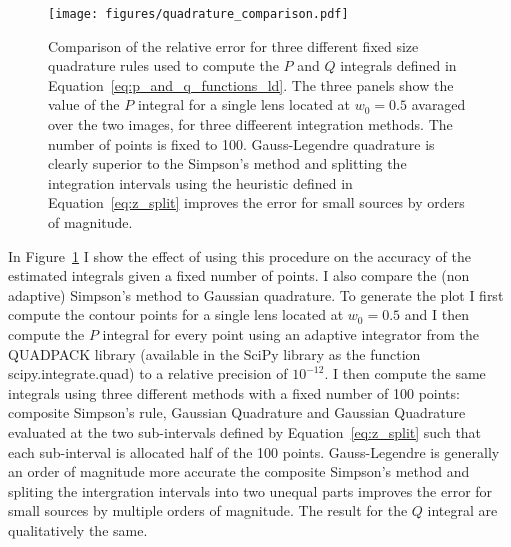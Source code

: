 \documentclass[12pt,dvipsnames]{report}
\newcommand{\ssf}[1]{\textsf{#1}}
\begin{document}
\begin{figure}[t]
    \begin{centering}
        \texttt{[image: figures/quadrature\_comparison.pdf]}
        \caption{Comparison of the relative error for three different fixed size quadrature rules 
        used to compute the $P$ and $Q$ integrals defined in 
        Equation~\ref{eq:p_and_q_functions_ld}. The three panels show the value of the $P$ integral 
        for a single lens located at $w_0=0.5$ avaraged 
        over the two images, for three diffeerent integration methods. The number of points 
        is fixed to 100. Gauss-Legendre quadrature is clearly superior to the Simpson's method
        and splitting the integration intervals using the heuristic defined in 
        Equation~\ref{eq:z_split} improves the error for small sources by orders of magnitude.}
        \label{fig:quadrature_comparison}
    \end{centering}
\end{figure}

In Figure~\ref{fig:quadrature_comparison} I show the effect of using this procedure on the 
accuracy of the estimated integrals given a fixed number of points. I also compare the (non 
adaptive) Simpson's method to Gaussian quadrature.
To generate the plot I first compute the contour points 
for a single lens located at $w_0=0.5$ and I then compute the $P$ integral for every point 
using an adaptive integrator from the \ssf{QUADPACK} library (available in the SciPy library as 
the function \ssf{scipy.integrate.quad}) to a relative precision of $10^{-12}$. I then compute
the same integrals using three different methods with a fixed number of 100 points: composite 
Simpson's rule, Gaussian Quadrature and Gaussian Quadrature evaluated at the two sub-intervals
defined by Equation~\ref{eq:z_split} such that each sub-interval is allocated half of the 100 
points. Gauss-Legendre is generally an order of  magnitude more accurate the composite Simpson's 
method and spliting the intergration intervals into two unequal parts improves the error 
for small  sources by multiple orders of magnitude.
The result for the $Q$ integral are qualitatively the same. 
\end{document}
